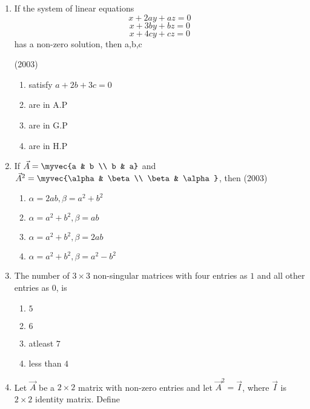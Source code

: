 	\begin{enumerate}
\item
	If the system of linear equations $$x+2ay+az = 0$$ $$x+3by+bz = 0$$ $$x+4cy+cz = 0$$ has a non-zero solution, then a,b,c

	\hfill (2003)

\begin{multicols}{2}
	\begin{enumerate}
                \item satisfy $a+ 2b+3c = 0$
                \item are in A.P
                \item are in G.P
                \item are in H.P
        \end{enumerate} 	
\end{multicols}
%
\item
        If $\vec{A}=\myvec{a & b \\ b & a}$ and $\vec{A}^{2}=\myvec{\alpha & \beta \\ \beta & \alpha}$, then 
	\hfill (2003)
\begin{multicols}{2}
        \begin{enumerate}
		\item $\alpha=2ab, \beta=a^{2}+b^{2}$
                \item $\alpha=a^{2}+b^{2}, \beta=ab$
                \item $\alpha=a^{2}+b^{2}, \beta=2ab$
                \item $\alpha=a^{2}+b^{2}, \beta=a^{2}-b^{2}$
        \end{enumerate}
\end{multicols}
%
			\newcommand{\adj}[1]{\text{adj}\brak{#1}}
%
    \item The number of $3\times3$ non-singular matrices with four entries as $1$ and all other entries as $0$, is 
	\hfill{}
%
\begin{multicols}{4}
	\begin{enumerate}
                \item $5$ 
		\item $6$
		\item atleast $7$
		\item less than $4$ 
	\end{enumerate}
\end{multicols}
    \item Let $\vec{A}$ be a $2\times2$ matrix with non-zero entries and let $\vec{A}^2 = \vec{I}$, where $\vec{I}$ is $2\times2$ identity matrix. Define 

\end{enumerate}
